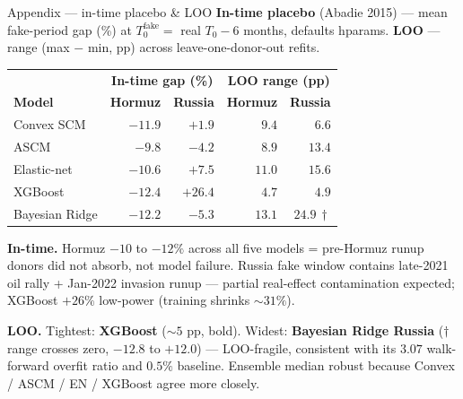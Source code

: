 \documentclass[aspectratio=169,11pt]{beamer}
\newcommand{\src}[1]{{\footnotesize\textcolor{muted}{(#1)}}}
\newcommand{\smalltext}[1]{{\footnotesize\textcolor{muted}{#1}}}
\newcommand{\hd}[1]{\textbf{#1}}
\begin{document}
\begin{frame}{Appendix --- in-time placebo \& LOO}
  \footnotesize
  \hd{In-time placebo} \src{Abadie 2015} --- mean fake-period gap (\%) at $T_0^{\text{fake}} = $ real $T_0 - 6$ months, defaults hparams. \hd{LOO} --- range (max $-$ min, pp) across leave-one-donor-out refits.

  \vspace{0.4em}
  \begin{center}
  \begin{tabular}{@{}l r r | r r@{}}
    \toprule
                   & \multicolumn{2}{c|}{\hd{In-time gap (\%)}} & \multicolumn{2}{c}{\hd{LOO range (pp)}} \\
    \hd{Model}     & \hd{Hormuz} & \hd{Russia} & \hd{Hormuz} & \hd{Russia} \\
    \midrule
    Convex SCM     & $-11.9$ & $+1.9$  & $9.4$           & $6.6$           \\
    ASCM           & $-9.8$  & $-4.2$  & $8.9$           & $13.4$          \\
    Elastic-net    & $-10.6$ & $+7.5$  & $11.0$          & $15.6$          \\
    XGBoost        & $-12.4$ & $+26.4$ & $\mathbf{4.7}$  & $\mathbf{4.9}$  \\
    Bayesian Ridge & $-12.2$ & $-5.3$  & $13.1$          & $24.9\,\dagger$ \\
    \bottomrule
  \end{tabular}
  \end{center}

  \vspace{0.5em}
  \smalltext{\hd{In-time.} Hormuz $-10$ to $-12\%$ across all five models = pre-Hormuz runup donors did not absorb, not model failure. Russia fake window contains late-2021 oil rally + Jan-2022 invasion runup --- partial real-effect contamination expected; XGBoost $+26\%$ low-power (training shrinks $\sim 31\%$).}

  \vspace{0.3em}
  \smalltext{\hd{LOO.} Tightest: \hd{XGBoost} ($\sim 5$ pp, bold). Widest: \hd{Bayesian Ridge Russia} ($\dagger$ range crosses zero, $-12.8$ to $+12.0$) --- LOO-fragile, consistent with its $3.07$ walk-forward overfit ratio and $0.5\%$ baseline. Ensemble median robust because Convex / ASCM / EN / XGBoost agree more closely.}
  \normalsize
\end{frame}
\end{document}
